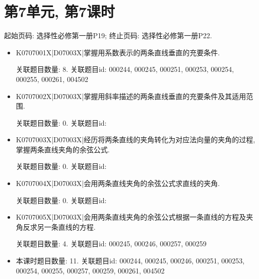 \section*{第7单元, 第7课时}
起始页码: 选择性必修第一册P19; 终止页码: 选择性必修第一册P22.
\begin{itemize}
\item K0707001X|D07003X|掌握用系数表示的两条直线垂直的充要条件.

关联题目数量: 8. 关联题目id: 000244, 000245, 000251, 000253, 000254, 000255, 000261, 004502

\item K0707002X|D07003X|掌握用斜率描述的两条直线垂直的充要条件及其适用范围.

关联题目数量: 0. 关联题目id: 

\item K0707003X|D07003X|经历将两条直线的夹角转化为对应法向量的夹角的过程, 掌握两条直线夹角的余弦公式.

关联题目数量: 0. 关联题目id: 

\item K0707004X|D07003X|会用两条直线夹角的余弦公式求直线的夹角.

关联题目数量: 0. 关联题目id: 

\item K0707005X|D07003X|会用两条直线夹角的余弦公式根据一条直线的方程及夹角反求另一条直线的方程.

关联题目数量: 4. 关联题目id: 000245, 000246, 000257, 000259

\item 本课时题目数量: 11. 关联题目id: 000244, 000245, 000246, 000251, 000253, 000254, 000255, 000257, 000259, 000261, 004502

\end{itemize}


